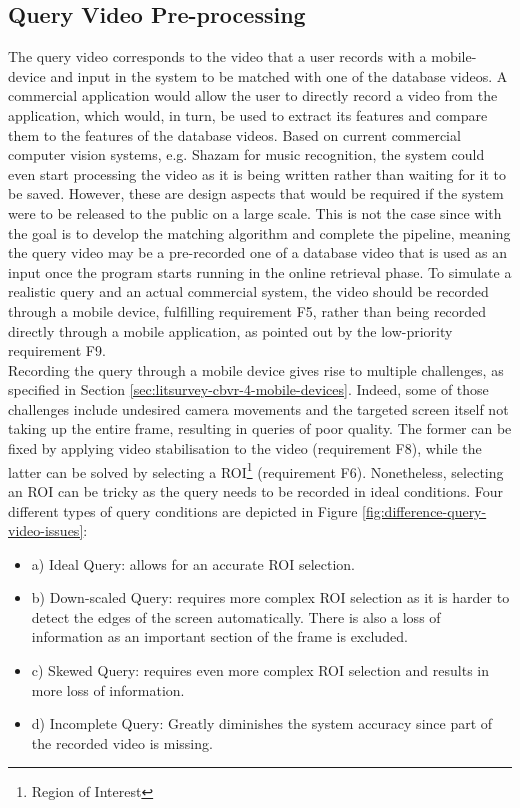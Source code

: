 \subsection{Query Video Pre-processing}

The query video corresponds to the video that a user records with a mobile-device and input in the system to be matched with one of the database videos. A commercial application would allow the user to directly record a video from the application, which would, in turn, be used to extract its features and compare them to the features of the database videos. Based on current commercial computer vision systems, e.g. Shazam for music recognition, the system could even start processing the video as it is being written rather than waiting for it to be saved. However, these are design aspects that would be required if the system were to be released to the public on a large scale. This is not the case since with the goal is to develop the matching algorithm and complete the pipeline, meaning the query video may be a pre-recorded one of a database video that is used as an input once the program starts running in the online retrieval phase. To simulate a realistic query and an actual commercial system, the video should be recorded through a mobile device, fulfilling requirement F5, rather than being recorded directly through a mobile application, as pointed out by the low-priority requirement F9.\\

Recording the query through a mobile device gives rise to multiple challenges, as specified in Section \ref{sec:litsurvey-cbvr-4-mobile-devices}. Indeed, some of those challenges include undesired camera movements and the targeted screen itself not taking up the entire frame, resulting in queries of poor quality. The former can be fixed by applying video stabilisation to the video (requirement F8), while the latter can be solved by selecting a ROI\footnote{Region of Interest} (requirement F6). Nonetheless, selecting an ROI can be tricky as the query needs to be recorded in ideal conditions. Four different types of query conditions are depicted in Figure \ref{fig:difference-query-video-issues}:
\begin{itemize}
    \item a) Ideal Query: allows for an accurate ROI selection.
    \item b) Down-scaled Query: requires more complex ROI selection as it is harder to detect the edges of the screen automatically. There is also a loss of information as an important section of the frame is excluded.
    \item c) Skewed Query: requires even more complex ROI selection and results in more loss of information.
    \item d) Incomplete Query: Greatly diminishes the system accuracy since part of the recorded video is missing.
\end{itemize}

